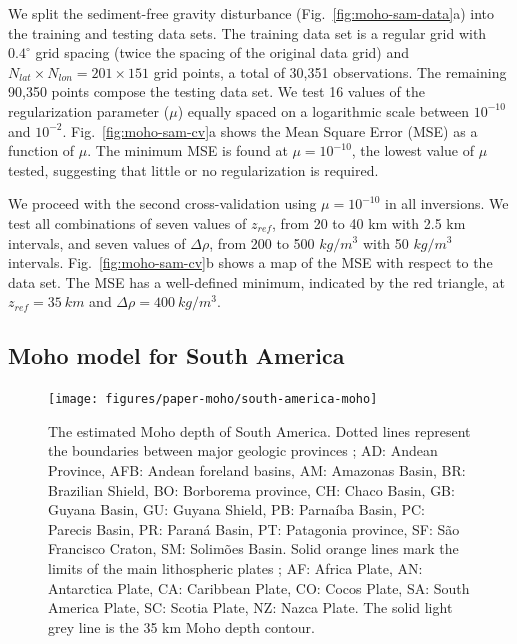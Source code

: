 We split the sediment-free gravity disturbance (Fig.~\ref{fig:moho-sam-data}a) into
the training and testing data sets.
The training data set is a regular grid with $0.4^\circ$ grid spacing
(twice the spacing of the original data grid)
and $N_{lat} \times N_{lon} = 201 \times 151$ grid points,
a total of 30,351 observations.
The remaining 90,350 points compose the testing data set.
We test 16 values of the regularization parameter ($\mu$)
equally spaced on a logarithmic scale between $10^{-10}$ and $10^{-2}$.
Fig.~\ref{fig:moho-sam-cv}a shows the Mean Square Error (MSE)
as a function of $\mu$.
The minimum MSE is found at $\mu = 10^{-10}$, the lowest value of $\mu$ tested,
suggesting that little or no regularization is required.

We proceed with the second cross-validation using $\mu = 10^{-10}$ in all
inversions.
We test all combinations of
seven values of $z_{ref}$, from 20 to 40 km with 2.5 km intervals,
and seven values of $\Delta\rho$, from 200 to 500 $kg/m^3$
with 50 $kg/m^3$ intervals.
Fig.~\ref{fig:moho-sam-cv}b shows a map of the MSE
with respect to the \citet{assumpcao2013a} data set.
The MSE has a well-defined minimum, indicated by the red triangle,
at $z_{ref} = 35\ km$ and $\Delta\rho = 400\ kg/m^3$.


\subsection{Moho model for South America}

\begin{figure}
    \centering
    \texttt{[image: figures/paper-moho/south-america-moho]}
    \caption{
        The estimated Moho depth of South America.
        Dotted lines represent the boundaries between major geologic provinces
        \citep[after][]{assumpcao2013a, goutorbe2015};
        AD: Andean Province,
        AFB: Andean foreland basins,
        AM: Amazonas Basin,
        BR: Brazilian Shield,
        BO: Borborema province,
        CH: Chaco Basin,
        GB: Guyana Basin,
        GU: Guyana Shield,
        PB: Parnaíba Basin,
        PC: Parecis Basin,
        PR: Paraná Basin,
        PT: Patagonia province,
        SF: São Francisco Craton,
        SM: Solimões Basin.
        Solid orange lines mark the limits of the main lithospheric plates
        \citep{bird2003a};
        AF: Africa Plate,
        AN: Antarctica Plate,
        CA: Caribbean Plate,
        CO: Cocos Plate,
        SA: South America Plate,
        SC: Scotia Plate,
        NZ: Nazca Plate.
        The solid light grey line is the 35 km Moho depth contour.
    }
    \label{fig:moho-sam-moho}
\end{figure}

